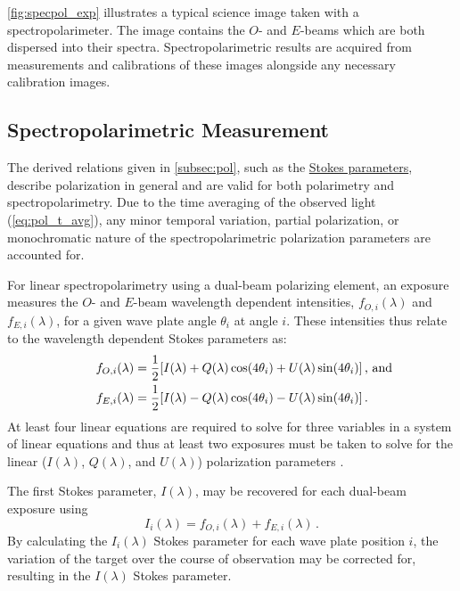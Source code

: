 \autoref{fig:specpol_exp} illustrates a typical science image taken with a spectropolarimeter. The image contains the $O$- and $E$-beams which are both dispersed into their spectra. Spectropolarimetric results are acquired from measurements and calibrations of these images alongside any necessary calibration images.

\subsection{Spectropolarimetric Measurement}

The derived relations given in \autoref{subsec:pol}, such as the \hyperref[eq:Stokes_params]{Stokes parameters}, describe polarization in general and are valid for both polarimetry and spectropolarimetry. Due to the time averaging of the observed light (\autoref{eq:pol_t_avg}), any minor temporal variation, partial polarization, or monochromatic nature of the spectropolarimetric polarization parameters are accounted for.

For linear spectropolarimetry using a dual-beam polarizing element, an exposure measures the $O$- and $E$-beam wavelength dependent intensities, $f_{O, i}(\lambda)$ and $f_{E, i}(\lambda)$, for a given wave plate angle $\theta_{i}$ at angle $i$. These intensities thus relate to the wavelength dependent Stokes parameters as:
\begin{equation} \label{eq:specpol_flux_to_Stokes}
    \begin{aligned}
        f_{O, i}(\lambda) &= \frac{1}{2} [I(\lambda) + Q(\lambda)\cos(4\theta_{i}) + U(\lambda)\sin(4\theta_{i})] \rlap{\,,\ and}\\
        f_{E, i}(\lambda) &= \frac{1}{2} [I(\lambda) - Q(\lambda)\cos(4\theta_{i}) - U(\lambda)\sin(4\theta_{i})]\,.
    \end{aligned}
\end{equation}
At least four linear equations are required to solve for three variables in a system of linear equations and thus at least two exposures must be taken to solve for the linear ($I(\lambda)$, $Q(\lambda)$, and $U(\lambda)$) polarization parameters \citep{pol_std, keller_instr}.

The first Stokes parameter, $I(\lambda)$, may be recovered for each dual-beam exposure using
\begin{equation} \label{eq:specpol_I_calc}
    I_{i}(\lambda) = f_{O, i}(\lambda) + f_{E, i}(\lambda)\,.
\end{equation}
By calculating the $I_{i}(\lambda)$ Stokes parameter for each wave plate position $i$, the variation of the target over the course of observation may be corrected for, resulting in the $I(\lambda)$ Stokes parameter.

